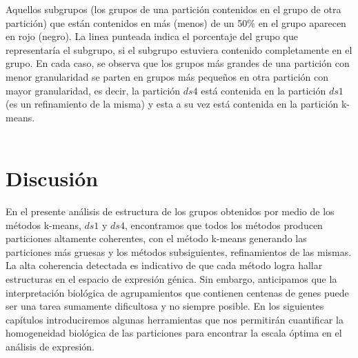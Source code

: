 Aquellos subgrupos (los grupos de una partición contenidos en el grupo de otra partición) que están contenidos en más (menos) de un 50\% en el grupo aparecen en rojo (negro). La linea punteada indica el porcentaje del grupo que representaría el subgrupo, si el subgrupo estuviera contenido completamente en el grupo.
En cada caso, se observa que los grupos más grandes de una partición con menor granularidad se parten en grupos más pequeños en otra partición con mayor granularidad, es decir, la partición $ds4$ está contenida en la partición $ds1$ (es un refinamiento de la misma) y esta a su vez está contenida en la partición k-means.\\\\
\clearpage
\section{Discusión}
En el presente análisis de estructura de los grupos obtenidos por medio de los métodos k-means, $ds1$ y $ds4$, encontramos que todos los métodos producen particiones altamente coherentes, con el método k-means generando las particiones más gruesas y los métodos subsiguientes, refinamientos de las mismas. La alta coherencia detectada es indicativo de que cada método logra  hallar estructuras en el espacio de expresión génica. Sin embargo, anticipamos que la interpretación biológica de agrupamientos que contienen centenas de genes puede ser una tarea sumamente dificultosa y no siempre posible. En los siguientes capítulos introduciremos algunas herramientas que nos permitirán cuantificar la homogeneidad biológica de las particiones para encontrar la escala óptima en el análisis de expresión.